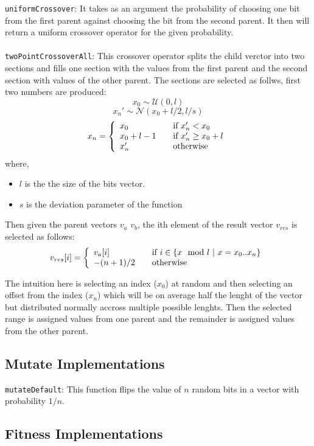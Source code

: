 \documentclass[10pt]{article}
\begin{document}
\verb+uniformCrossover+: It takes as an argument the probability of choosing one bit from the first parent against choosing the bit from the second parent. It then will return a uniform crossover operator for the given probability.
\\\\
\verb+twoPointCrossoverAll+: This crossover operator splits the child verctor into two sections and fills one section with the values from the first parent and the second section with values of the other parent. The sections are selected as follws, first two numbers are produced:
\[
x_0 \sim \mathcal{U}(0,l)
\]
\[
x_n' \sim \mathcal{N}(x_0 + l/2,l/s)
\]
\[
x_n = \left\{
    \begin{array}{l l}
    x_0 & \quad \text{if $x_n' < x_0$}\\
    x_0+l-1 & \quad \text{if $x_n' \geq x_0 + l$}\\
    x_n' & \quad \text{otherwise}
    \end{array} \right.
\]
where,
\begin{itemize}
\item $l$ is the the size of the bits vector.
\item $s$ is the deviation parameter of the function
\end{itemize}

Then given the parent vectors $v_a$ $v_b$, the ith element of the result vector $v_{res}$ is selected as follows:
\[ v_{res}[i] = \left\{ 
  \begin{array}{l l}
    v_a[i] & \quad \text{if $i \in \{x \mod{l}\ |\ x = x_0 .. x_n \}$}\\
    -(n+1)/2 & \quad \text{otherwise}
  \end{array} \right.
\]

The intuition here is selecting an index ($x_0$) at random and then selecting an offset from the index ($x_n$) which will be on average half the lenght of the vector but distributed normally accross multiple possible lenghts. Then the selected range is assigned values from one parent and the remainder is assigned values from the other parent.

\subsection{Mutate Implementations}

\verb+mutateDefault+: This function flips the value of $n$ random bits in a vector with probability $1/n$.

\subsection{Fitness Implementations}
\end{document}
